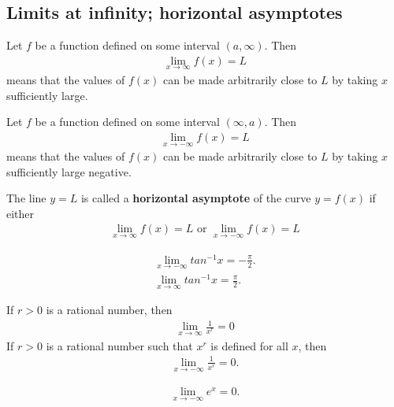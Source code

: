 \documentclass{article}
\begin{document}
\subsection{Limits at infinity; horizontal asymptotes}
\begin{definition}
    Let $f$ be a function defined on some interval $(a,\infty)$. Then
    \begin{align*}
        \lim_{x\to\infty}f(x)=L
    \end{align*}
    means that the values of $f(x)$ can be made arbitrarily close to $L$ by taking $x$ sufficiently large.
\end{definition}
\begin{definition}
    Let $f$ be a function defined on some interval $(\infty, a)$. Then
    \begin{align*}
        \lim_{x\to -\infty}f(x)=L
    \end{align*}
    means that the values of $f(x)$ can be made arbitrarily close to $L$ by taking $x$ sufficiently large negative.
\end{definition}
\begin{definition}
    The line $y=L$ is called a \textbf{horizontal asymptote} of the curve $y=f(x)$ if either
    \begin{align*}
        \lim_{x\to \infty}f(x)=L \text{ or } \lim_{x\to-\infty}f(x)=L
    \end{align*}
\end{definition}
\begin{theorem}
    \begin{align*}
        \lim_{x\to-\infty}tan^{-1}x=-\frac{\pi}{2}. \\
        \lim_{x\to\infty}tan^{-1}x=\frac{\pi}{2}.
    \end{align*}
\end{theorem}
\begin{theorem}
    If $r>0$ is a rational number, then
    \begin{align*}
        \lim_{x\to\infty}\frac{1}{x^r}=0
    \end{align*}
    If $r>0$ is a rational number such that $x^r$ is defined for all $x$, then
    \begin{align*}
        \lim_{x\to-\infty}\frac{1}{x^r}=0.
    \end{align*}
\end{theorem}
\begin{theorem}
    \begin{align*}
        \lim_{x\to-\infty}e^x=0.
    \end{align*}
\end{theorem}
\end{document}
